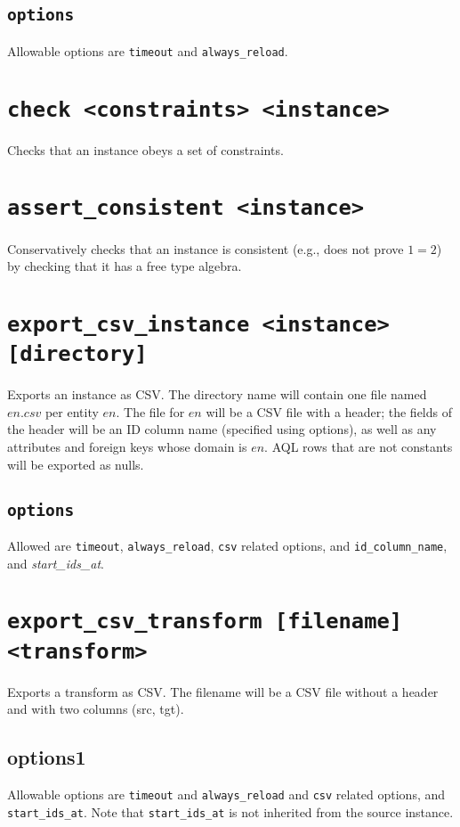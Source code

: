 \documentclass[10pt]{book}
\begin{document}
\subsection{{\tt options}}

Allowable options are {\tt timeout} and {\tt always\_reload}.

\section{{\tt check <constraints> <instance>}}

Checks that an instance obeys a set of constraints.

\section{{\tt assert\_consistent <instance>}}

Conservatively checks that an instance is consistent (e.g., does not prove $1=2$) by checking that it has a free type algebra.


\section{{\tt export\_csv\_instance <instance> [directory]}} 

Exports an instance as CSV.  The directory name will contain one file named $en.csv$ per entity $en$.  The file for $en$ will be a CSV file with a header; the fields of the header will be an ID column name (specified using options), as well as any attributes and foreign keys whose domain is $en$.   AQL rows that are not constants will be exported as nulls.  

\subsection{{\tt options}}
Allowed are {\tt timeout}, {\tt always\_reload}, {\tt csv} related options, and {\tt id\_column\_name}, and {\it start\_ids\_at}.

\section{{\tt export\_csv\_transform [filename] <transform>}}

Exports a transform as CSV.  The filename will be a CSV file without a header and with two columns (src, tgt).  

\subsection{options1}
Allowable options are {\tt timeout} and {\tt always\_reload}  and {\tt csv} related options, and {\tt start\_ids\_at}.  Note that {\tt start\_ids\_at} is not inherited from the source instance.
\end{document}
